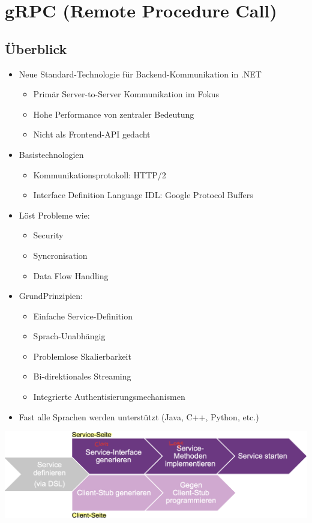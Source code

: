 
\section{gRPC (Remote Procedure Call)}

\subsection{Überblick}
\begin{itemize}
    \item Neue Standard-Technologie für Backend-Kommunikation in .NET
    \begin{itemize}
        \item Primär Server-to-Server Kommunikation im Fokus
        \item Hohe Performance von zentraler Bedeutung
        \item Nicht als Frontend-API gedacht
    \end{itemize}
    \item Basistechnologien
    \begin{itemize}
        \item Kommunikationsprotokoll: HTTP/2
        \item Interface Definition Language IDL: Google Protocol Buffers
    \end{itemize}
    \item Löst Probleme wie:
    \begin{itemize}
        \item Security
        \item Syncronisation
        \item Data Flow Handling
    \end{itemize}
    \item GrundPrinzipien:
    \begin{itemize}
        \item Einfache Service-Definition
        \item Sprach-Unabhängig
        \item Problemlose Skalierbarkeit
        \item Bi-direktionales Streaming
        \item Integrierte Authentisierungsmechanismen
    \end{itemize}
    \item Fast alle Sprachen werden unterstützt (Java, C++, Python, etc.)
\end{itemize}
\vspace{-8pt}
\begin{center}
    \includegraphics[scale=.27]{graphic/gprc/Developer Workflow.png}
\end{center}
\vspace{-8pt}



